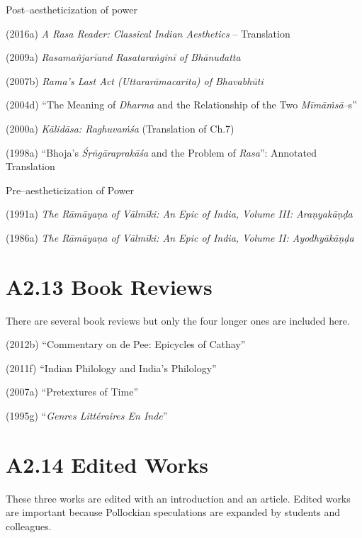 Post–aestheticization of power

(2016a) \textit{A Rasa Reader: Classical Indian Aesthetics} – Translation

(2009a) \textit{Rasamañjarīand Rasataraṅginī of Bhānudatta}

(2007b) \textit{Rama's Last Act (Uttararāmacarita) of Bhavabhūti}

(2004d) “The Meaning of \textit{Dharma} and the Relationship of the Two \textit{Mīmāṁsā}–s”

(2000a) \textit{Kālidāsa: Raghuvaṁśa} (Translation of Ch.7)

(1998a) “Bhoja's \textit{Śṛṅgāraprakāśa} and the Problem of \textit{Rasa}”: Annotated Translation

Pre–aestheticization of Power

(1991a) \textit{The Rāmāyaṇa of Vālmīki: An Epic of India, Volume III: Araṇyakāṇḍa}

(1986a) \textit{The Rāmāyaṇa of Vālmīki: An Epic of India, Volume II: Ayodhyākāṇḍa }


\section*{A2.13 Book Reviews}

There are several book reviews but only the four longer ones are included here.

(2012b) “Commentary on de Pee: Epicycles of Cathay”

(2011f) “Indian Philology and India’s Philology”

(2007a) “Pretextures of Time”

(1995g) “\textit{Genres Littéraires En Inde}”


\section*{A2.14 Edited Works}

These three works are edited with an introduction and an article. Edited works are important because Pollockian speculations are expanded by students and colleagues.

